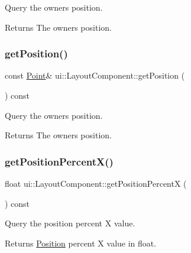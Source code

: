 Query the owner\textquotesingle{}s position. \begin{DoxyReturn}{Returns}
The owner\textquotesingle{}s position. 
\end{DoxyReturn}
\mbox{\label{classui_1_1LayoutComponent_a666e2c092d4db37768ab1cd9acd50a91}} 
\subsubsection{\texorpdfstring{get\+Position()}{getPosition()}\hspace{0.1cm}{\footnotesize\ttfamily [2/2]}}
{\footnotesize\ttfamily const \hyperlink{classVec2}{Point}\& ui\+::\+Layout\+Component\+::get\+Position (\begin{DoxyParamCaption}{ }\end{DoxyParamCaption}) const}

Query the owner\textquotesingle{}s position. \begin{DoxyReturn}{Returns}
The owner\textquotesingle{}s position. 
\end{DoxyReturn}
\mbox{\label{classui_1_1LayoutComponent_a91fb3991c0d9da922b53f58c8453fcbf}} 
\subsubsection{\texorpdfstring{get\+Position\+Percent\+X()}{getPositionPercentX()}\hspace{0.1cm}{\footnotesize\ttfamily [1/2]}}
{\footnotesize\ttfamily float ui\+::\+Layout\+Component\+::get\+Position\+PercentX (\begin{DoxyParamCaption}{ }\end{DoxyParamCaption}) const}

Query the position percent X value. \begin{DoxyReturn}{Returns}
\hyperlink{structPosition}{Position} percent X value in float. 
\end{DoxyReturn}
\mbox{\label{classui_1_1LayoutComponent_a91fb3991c0d9da922b53f58c8453fcbf}} 
